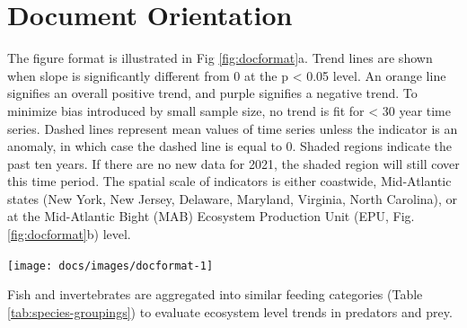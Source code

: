 \documentclass[
  10pt,
]{article}
\let\origfigure\figure
\let\endorigfigure\endfigure
\renewenvironment{figure}[1][2] {
    \expandafter\origfigure\expandafter[H]
} {
    \endorigfigure
}
\begin{document}
\newpage

\hypertarget{document-orientation}{%
\section{Document Orientation}\label{document-orientation}}

The figure format is illustrated in Fig \ref{fig:docformat}a. Trend
lines are shown when slope is significantly different from 0 at the p
\textless{} 0.05 level. An orange line signifies an overall positive
trend, and purple signifies a negative trend. To minimize bias
introduced by small sample size, no trend is fit for \textless{} 30 year
time series. Dashed lines represent mean values of time series unless
the indicator is an anomaly, in which case the dashed line is equal to
0. Shaded regions indicate the past ten years. If there are no new data
for 2021, the shaded region will still cover this time period. The
spatial scale of indicators is either coastwide, Mid-Atlantic states
(New York, New Jersey, Delaware, Maryland, Virginia, North Carolina), or
at the Mid-Atlantic Bight (MAB) Ecosystem Production Unit (EPU, Fig.
\ref{fig:docformat}b) level.

\begin{figure}

{\centering \texttt{[image: docs/images/docformat-1]} 

}

\caption{Document orientation. a. Key to figures. b.The Northeast Large Marine Ecosystem.}\label{fig:docformat}
\end{figure}

Fish and invertebrates are aggregated into similar feeding categories
(Table \ref{tab:species-groupings}) to evaluate ecosystem level trends
in predators and prey.
\end{document}
